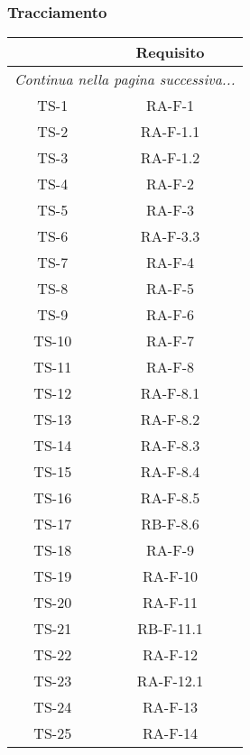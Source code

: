 	\subsubsection{Tracciamento}
		\begin{center}
			\begin{longtable}{|c|c|}
			\hline
			\rowcolor{lighter-grayer}{ \textbf{Codice} } & {\textbf{Requisito} } \\ \hline
			\endhead
			\multicolumn{2}{|c|}{\textit{Continua nella pagina successiva...}}\\
			\hline
			\hline
			\endfoot
			\endlastfoot

			\hline
			TS-1 & RA-F-1 \\
			\hline
			TS-2 & RA-F-1.1 \\
			\hline
			TS-3 & RA-F-1.2 \\
			\hline
			TS-4 & RA-F-2 \\
			\hline
			TS-5 & RA-F-3 \\
			\hline
			TS-6 & RA-F-3.3 \\
			\hline
			TS-7 & RA-F-4 \\
			\hline
			TS-8 & RA-F-5 \\
			\hline
			TS-9 & RA-F-6 \\
			\hline
			TS-10 & RA-F-7 \\
			\hline
			TS-11 & RA-F-8 \\
			\hline
			TS-12 & RA-F-8.1 \\
			\hline
			TS-13 & RA-F-8.2 \\
			\hline
			TS-14 & RA-F-8.3 \\
			\hline
			TS-15 & RA-F-8.4 \\
			\hline
			TS-16 & RA-F-8.5 \\
			\hline
			TS-17 & RB-F-8.6 \\
			\hline
			TS-18 & RA-F-9 \\
			\hline
			TS-19 & RA-F-10 \\
			\hline
			TS-20 & RA-F-11 \\
			\hline
			TS-21 & RB-F-11.1 \\
			\hline
			TS-22 & RA-F-12 \\
			\hline
			TS-23 & RA-F-12.1 \\
			\hline
			TS-24 & RA-F-13 \\
			\hline
			TS-25 & RA-F-14 \\

\end{longtable}
\end{center}
